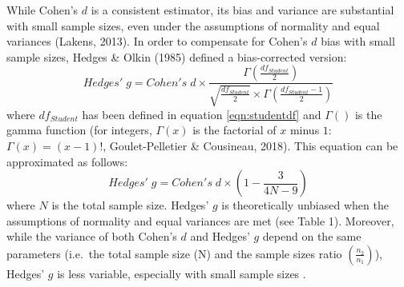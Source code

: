 \documentclass[
  12pt,
  french,
]{article}
\begin{document}
While Cohen's \(d\) is a consistent estimator, its bias and variance are
substantial with small sample sizes, even under the assumptions of
normality and equal variances (Lakens, 2013). In order to compensate for
Cohen's \(d\) bias with small sample sizes, Hedges \& Olkin (1985)
defined a bias-corrected version: \begin{equation*} 
Hedges' \; g = Cohen's \; d \times \frac{\Gamma(\frac{df_{Student}}{2})}{\sqrt{\frac{df_{Student}}{2}} \times \Gamma(\frac{df_{Student}-1}{2})}
\label{eqn:Hedgesgs}
\end{equation*} where \(df_{Student}\) has been defined in equation
\ref{eqn:studentdf} and \(\Gamma()\) is the gamma function (for
integers, \(\Gamma(x)\) is the factorial of \(x\) minus \(1\):
\(\Gamma(x)=(x-1)!\), Goulet-Pelletier \& Cousineau, 2018). This
equation can be approximated as follows: \begin{equation*} 
Hedges' \; g = Cohen's \; d \times \left( 1- \frac{3}{4N -9} \right)
\label{eqn:Hedgesgsapprox}
\end{equation*} where \(N\) is the total sample size. Hedges' \(g\) is
theoretically unbiased when the assumptions of normality and equal
variances are met (see Table 1). Moreover, while the variance of both
Cohen's \(d\) and Hedges' \(g\) depend on the same parameters (i.e.~the
total sample size (N) and the sample sizes ratio
\(\left(\frac{n_2}{n_1}\right)\)), Hedges' \(g\) is less variable,
especially with small sample sizes
.
\end{document}
